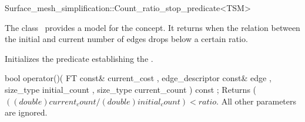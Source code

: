 

\begin{ccRefClass}{Surface_mesh_simplification::Count_ratio_stop_predicate<TSM>}


\ccDefinition

The class \ccRefName\ provides a model for the  concept.
It returns  when the relation between the initial and current number 
of edges drops below a certain ratio.


\ccIsModel
{}

\ccCreation
{}  %

{Initializes the predicate establishing the .} 

\ccOperations

  \ccMethod
    {bool operator()( FT const&              current_cost
                    , edge_descriptor const& edge
                    , size_type              initial_count
                    , size_type              current_count
                    ) const ;
           }
  {Returns ( $((double)current_count/ (double)initial_count) < ratio$. All other parameters are ignored.}

\ccSeeAlso
{}

\end{ccRefClass}


